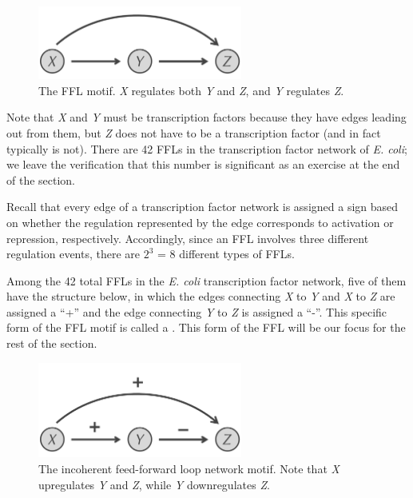 \begin{figure}[h]
\centering
\mySfFamily
\includegraphics[width = 0.6\textwidth]{../images/feed-forward_loop.png}
\caption{The FFL motif. \textit{X} regulates both \textit{Y} and \textit{Z}, and \textit{Y} regulates \textit{Z}.}
\label{fig:feed-forward_loop}
\end{figure}

Note that \textit{X} and \textit{Y} must be transcription factors because they have edges leading out from them, but \textit{Z} does not have to be a transcription factor (and in fact typically is not). There are 42 FFLs in the transcription factor network of \textit{E. coli}; we leave the verification that this number is significant as an exercise at the end of the section.

Recall that every edge of a transcription factor network is assigned a sign based on whether the regulation represented by the edge corresponds to activation or repression, respectively. Accordingly, since an FFL involves three different regulation events, there are $2^3$ = 8 different types of FFLs.

Among the 42 total FFLs in the \textit{E. coli} transcription factor network, five of them have the structure below, in which the edges connecting \textit{X} to \textit{Y} and \textit{X} to \textit{Z} are assigned a ``+'' and the edge connecting \textit{Y} to \textit{Z} is assigned a ``-''. This specific form of the FFL motif is  called a . This form of the FFL will be our focus for the rest of the section.

\begin{qbox}\end{qbox} 

\begin{figure}[h]
\centering
\mySfFamily
\includegraphics[width = 0.6\textwidth]{../images/type-1_incoherent_feed-forward_loop.png}
\caption{The incoherent feed-forward loop network motif. Note that \textit{X} upregulates \textit{Y} and \textit{Z}, while \textit{Y} downregulates \textit{Z}.}
\label{fig:type-1_incoherent_feed-forward_loop}
\end{figure}


